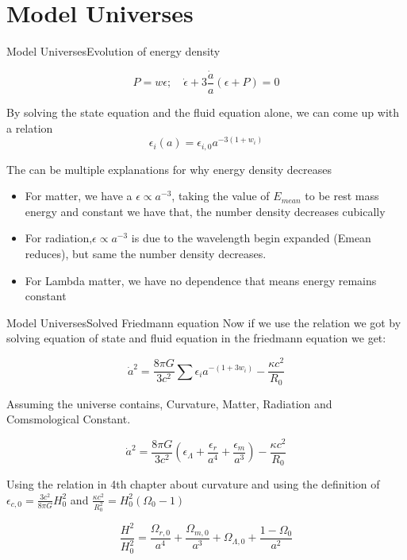 \section{Model Universes}

\begin{frame}{Model Universes}{Evolution of energy density}

	$$ P = w\epsilon; \hspace{1em} \dot\epsilon + 3\frac{\dot
	a}{a}(\epsilon + P) = 0 $$

By solving the state equation and the fluid equation alone, we can come up
with a relation
$$ \epsilon_i (a) = \epsilon_{i,0} a^{-3(1+w_i)}$$

The can be multiple explanations for why energy density decreases
\begin{itemize}[<+->]
	\item For matter, we have a $\epsilon \propto a^{-3}$, taking the value of
		$E_{mean}$ to be rest mass energy and constant we have that, the
		number density decreases cubically
	\item For radiation,$\epsilon \propto a^{-3}$ is due to the wavelength
		begin expanded (Emean reduces), but same the number density
		decreases.
	\item For Lambda matter, we have no dependence that means energy remains
		constant
\end{itemize}
\end{frame}


\begin{frame}{Model Universes}{Solved Friedmann equation}
Now if we use the relation we got by solving equation of state and fluid
equation in the friedmann equation we get:

$$ \dot a^2 = \frac{8\pi G}{3c^2} \sum \epsilon_i a^{-(1+3w_i)} -
\frac{\kappa c^2}{R_0} $$

Assuming the universe contains, Curvature, Matter, Radiation and Comsmological
Constant.

$$  \dot a^2 = \frac{8\pi G}{3c^2} ( \epsilon_\Lambda + \frac{\epsilon_r}{a^4} +  \frac{\epsilon_m}{a^3} ) -
\frac{\kappa c^2}{R_0}  $$

Using the relation in 4th chapter about curvature and using the definition of
$\epsilon_{c,0} = \frac{3c^2}{8\pi G}H_0^2 $ and $\frac{\kappa c^2}{R_0^2} = H_0^2(\Omega_0 - 1)$

$$ \frac{H^2}{H_0^2} = \frac{\Omega_{r,0}}{a^4} +
	\frac{\Omega_{m,0}}{a^3} + \Omega_{\Lambda,0} + \frac{1 - \Omega_{0}}{a^2} $$


\end{frame}

